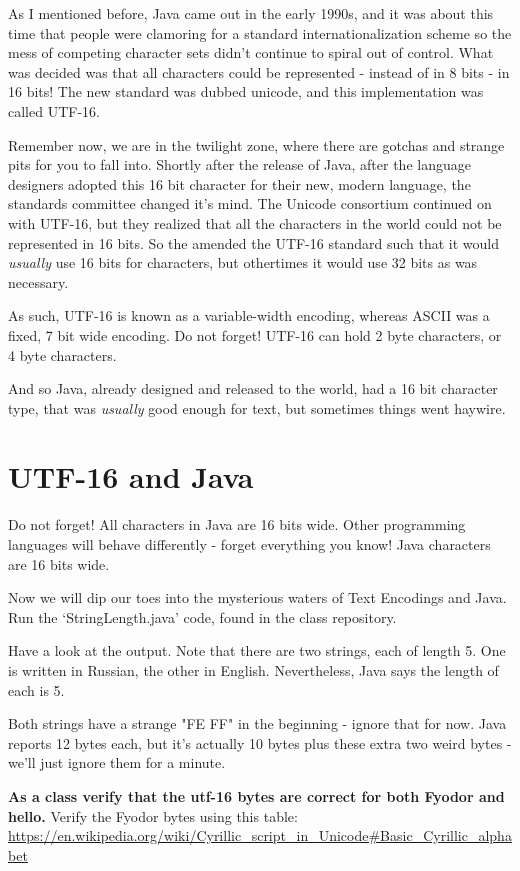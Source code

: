 \documentclass[12pt]{article}
\begin{document}
As I mentioned before, Java came out in the early 1990s, and it was about this time that people were clamoring for a standard internationalization scheme so the mess of competing character sets didn't continue to spiral out of control. What was decided was that all characters could be represented - instead of in 8 bits - in 16 bits! The new standard was dubbed unicode, and this implementation was called UTF-16. 

Remember now, we are in the twilight zone, where there are gotchas and strange pits for you to fall into. Shortly after the release of Java, after the language designers adopted this 16 bit character for their new, modern language, the standards committee changed it's mind. The Unicode consortium continued on with UTF-16, but they realized that all the characters in the world could not be represented in 16 bits. So the amended the UTF-16 standard such that it would \textit{usually} use 16 bits for characters, but othertimes it would use 32 bits as was necessary.

As such, UTF-16 is known as a variable-width encoding, whereas ASCII was a fixed, 7 bit wide encoding. Do not forget! UTF-16 can hold 2 byte characters, or 4 byte characters.

And so Java, already designed and released to the world, had a 16 bit character type, that was \textit{usually} good enough for text, but sometimes things went haywire.

\section{UTF-16 and Java}
Do not forget! All characters in Java are 16 bits wide. Other programming languages will behave differently - forget everything you know! Java characters are 16 bits wide.

Now we will dip our toes into the mysterious waters of Text Encodings and Java. Run the `StringLength.java' code, found in the class repository.

Have a look at the output. Note that there are two strings, each of length 5. One is written in Russian, the other in English. Nevertheless, Java says the length of each is 5. 

Both strings have a strange "FE FF" in the beginning - ignore that for now. Java reports 12 bytes each, but it's actually 10 bytes plus these extra two weird bytes - we'll just ignore them for a minute.

\begin{center}
\textbf{As a class verify that the utf-16 bytes are correct for both Fyodor and hello.}
Verify the Fyodor bytes using this table:
\url{https://en.wikipedia.org/wiki/Cyrillic_script_in_Unicode#Basic_Cyrillic_alphabet}
\end{center}
\end{document}
